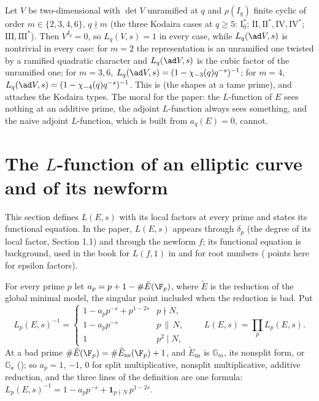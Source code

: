 \begin{example}\label{ex:lfunctions:finite-inertia}
Let $V$ be two-dimensional with $\det V$ unramified at $q$ and $\rho(I_q)$ finite cyclic of order $m\in\{2,3,4,6\}$, $q\nmid m$ (the three Kodaira cases at $q\ge5$:
$\mathrm I_0^*$; $\mathrm{II},\mathrm{II}^*,\mathrm{IV},\mathrm{IV}^*$; $\mathrm{III},\mathrm{III}^*$). Then $V^{I_q}=0$, so $L_q(V,s)=1$ in every case, while $L_q(\ad V,s)$ is nontrivial in every
case: for $m=2$ the representation is an unramified one twisted by a ramified quadratic character and $L_q(\ad V,s)$ is the cubic factor of the unramified one;
for $m=3,6$, $L_q(\ad V,s)=(1-\chi_{-3}(q)q^{-s})^{-1}$; for $m=4$, $L_q(\ad V,s)=(1-\chi_{-4}(q)q^{-s})^{-1}$. This is  (the shapes at a tame prime), and
 attaches the Kodaira types. The moral for the paper: the $L$-function of $E$ sees nothing at an additive prime, the adjoint
$L$-function always sees something, and the naive adjoint $L$-function, which is built from $a_q(E)=0$, cannot.
\end{example}

\section{The \texorpdfstring{$L$}{L}-function of an elliptic curve and of its newform}\label{sec:lfunctions:LE}

This section defines $L(E,s)$ with its local factors at every prime and states its functional equation. In the paper, $L(E,s)$ appears through $\delta_p$ (the
degree of its local factor, Section 1.1) and through the newform $f$; its functional equation is background, used in the book for $L(f,1)$ in
 and for root numbers ( points here for epsilon factors).

\begin{definition}\label{def:lfunctions:LE}
For every prime $p$ let $a_p=p+1-\#\tilde E(\F_p)$, where $\tilde E$ is the reduction of the global minimal model, the singular point included when the reduction is
bad. Put
\[
L_p(E,s)^{-1}=\begin{cases}1-a_pp^{-s}+p^{1-2s}&p\nmid N,\\1-a_pp^{-s}&p\,\|\,N,\\1&p^2\mid N,\end{cases}\qquad L(E,s)=\prod_pL_p(E,s).
\]
At a bad prime $\#\tilde E(\F_p)=\#\tilde E_{\mathrm{ns}}(\F_p)+1$, and $\tilde E_{\mathrm{ns}}$ is $\mathbb G_m$, its nonsplit form, or $\mathbb G_a$ (); so $a_p=1$, $-1$, $0$
for split multiplicative, nonsplit multiplicative, additive reduction, and the three lines of the definition are one formula: $L_p(E,s)^{-1}=1-a_pp^{-s}+\mathbf 1_{p\nmid N}\,p^{1-2s}$.
\end{definition}

